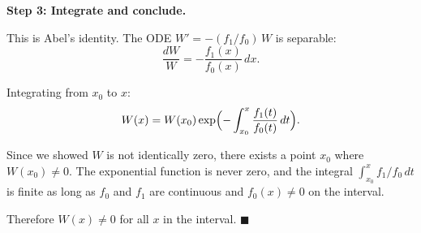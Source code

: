 \documentclass[12pt]{article}
\begin{document}
\textbf{Step 3: Integrate and conclude.}

This is Abel's identity. The ODE $W' = -(f_1/f_0)\,W$ is separable:
\[
\frac{dW}{W} = -\frac{f_1(x)}{f_0(x)}\,dx.
\]

Integrating from $x_0$ to $x$:
\[
W(x) = W(x_0)\exp\Bigl(-\int_{x_0}^x \frac{f_1(t)}{f_0(t)}\,dt\Bigr).
\]

Since we showed $W$ is not identically zero, there exists a point $x_0$ where $W(x_0) \neq 0$. The exponential function is never zero, and the integral $\int_{x_0}^x f_1/f_0\,dt$ is finite as long as $f_0$ and $f_1$ are continuous and $f_0(x) \neq 0$ on the interval.

Therefore $W(x) \neq 0$ for all $x$ in the interval. $\blacksquare$
\end{document}
